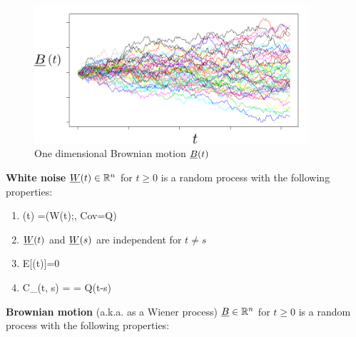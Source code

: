  \begin{figure}[h!]
  \centering
  \includegraphics[width=4in]
  {stochastic-diff-eqns/brownian-motion-labeled}
  \caption{One dimensional Brownian motion ${\underline{B}}(t)$}
  \label{fig-brownian-motion-t}
  \end{figure}
  
 

{\bf White noise} ${\underline{W}}(t)
\in{ \mathbb{R}}^n$ for $t\geq 0$
is a random process with the
following properties:

\begin{enumerate}
\item
\beq
\rvW(t) =\caln(W(t);, Cov=Q)
\eeq

\item
${\underline{W}}(t)$ and ${\underline{W}}(s)$ are independent for
$t\neq s$

\item

\beq E[\rvW(t)]=0
\eeq

\item
\beq
C_\rvW(t, s) =  = Q\delta(t-s)
\eeq



\end{enumerate}
{\bf Brownian motion} (a.k.a. as a Wiener process)
${\underline{B}}\in{ \mathbb{R}}^n$
for $t\geq 0$
is a random process with the
following properties: 

